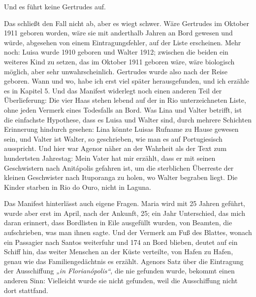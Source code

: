 \documentclass[
  ngerman,
  11pt,
  openany]{book}
\begin{document}
Und es führt keine Gertrudes auf.

Das schließt den Fall nicht ab, aber es wiegt schwer. Wäre Gertrudes im
Oktober 1911 geboren worden, wäre sie mit anderthalb Jahren an Bord
gewesen und würde, abgesehen von einem Eintragungsfehler, auf der Liste
erscheinen. Mehr noch: Luisa wurde 1910 geboren und Walter 1912;
zwischen die beiden ein weiteres Kind zu setzen, das im Oktober 1911
geboren wäre, wäre biologisch möglich, aber sehr unwahrscheinlich.
Gertrudes wurde also nach der Reise geboren. Wann und wo, habe ich erst
viel später herausgefunden, und ich erzähle es in Kapitel 5. Und das
Manifest widerlegt noch einen anderen Teil der Überlieferung: Die vier
Haas stehen lebend auf der in Rio unterzeichneten Liste, ohne jeden
Vermerk eines Todesfalls an Bord. Was Lina und Valter betrifft, ist die
einfachste Hypothese, dass es Luisa und Walter sind, durch mehrere
Schichten Erinnerung hindurch gesehen: Lina könnte Luisas Rufname zu
Hause gewesen sein, und Valter ist Walter, so geschrieben, wie man es
auf Portugiesisch ausspricht. Und hier war Agenor näher an der Wahrheit
als der Text zum hundertsten Jahrestag: Mein Vater hat mir erzählt, dass
er mit seinen Geschwistern nach Anitápolis gefahren ist, um die
sterblichen Überreste der kleinen Geschwister nach Ituporanga zu holen,
wo Walter begraben liegt. Die Kinder starben in Rio do Ouro, nicht in
Laguna.

Das Manifest hinterlässt auch eigene Fragen. Maria wird mit 25 Jahren
geführt, wurde aber erst im April, nach der Ankunft, 25; ein Jahr
Unterschied, das mich daran erinnert, dass Bordlisten in Eile ausgefüllt
wurden, von Beamten, die aufschrieben, was man ihnen sagte. Und der
Vermerk am Fuß des Blattes, wonach ein Passagier nach Santos weiterfuhr
und 174 an Bord blieben, deutet auf ein Schiff hin, das weiter Menschen
an der Küste verteilte, von Hafen zu Hafen, genau wie das
Familiengedächtnis es erzählt. Agenors Satz über die Eintragung der
Ausschiffung \emph{„in Florianópolis``}, die nie gefunden wurde, bekommt
einen anderen Sinn: Vielleicht wurde sie nicht gefunden, weil die
Ausschiffung nicht dort stattfand.
\end{document}
